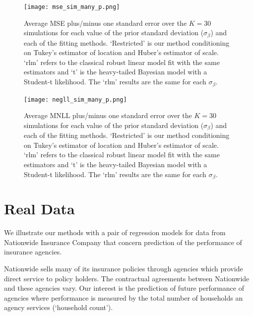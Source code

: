 \documentclass[ba]{imsart}
\begin{document}
\begin{figure}[t]
\centering
\texttt{[image: mse\_sim\_many\_p.png]}
\caption{Average MSE plus/minus one standard error over the $K = 30$ simulations for each value of the prior standard deviation ($\sigma_{\beta}$) and each of the fitting methods. `Restricted' is our method conditioning on Tukey's estimator of location and Huber's estimator of scale. `rlm' refers to the classical robust linear model fit with the same estimators and `t' is the heavy-tailed Bayesian model with a Student-t likelihood. The `rlm' results are the same for each $\sigma_{\beta}$.}
\label{mseSimMany}
\end{figure}

\begin{figure}[t]
\centering
\texttt{[image: negll\_sim\_many\_p.png]}
\caption{Average MNLL plus/minus one standard error over the $K = 30$ simulations for each value of the prior standard deviation ($\sigma_{\beta}$) and each of the fitting methods. `Restricted' is our method conditioning on Tukey's estimator of location and Huber's estimator of scale. `rlm' refers to the classical robust linear model fit with the same estimators and `t' is the heavy-tailed Bayesian model with a Student-t likelihood. The `rlm' results are the same for each $\sigma_{\beta}$.}
\label{negllSimMany}
\end{figure}



%
%
\section{Real Data}
\label{RealData}
We illustrate our methods with a pair of regression models for data from Nationwide Insurance Company that concern prediction of the performance of insurance agencies.

%
Nationwide sells many of its insurance policies through agencies which provide direct service to policy holders.  The contractual agreements between Nationwide and these agencies vary.  Our interest is the prediction of future performance of agencies where  performance is measured by the total number of households an agency services (`household count'). 
 
\end{document}
